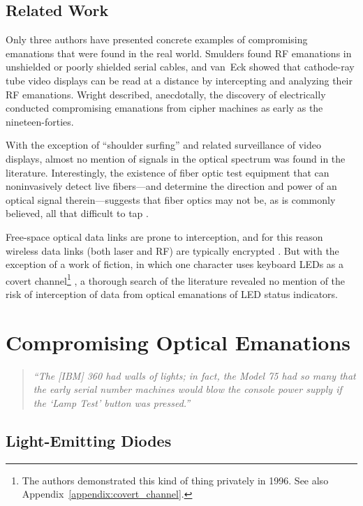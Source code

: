 \documentclass{acmtrans2e}
\begin{document}
\subsection{Related Work}

Only three authors have presented concrete examples of compromising 
emanations that were found in the real world.  Smulders \citeyear{smulders}
found RF emanations in
unshielded or poorly shielded serial cables, and van~Eck \citeyear{van_Eck}
showed that cathode-ray tube video displays can be read at a distance by 
intercepting and analyzing their RF emanations.  Wright \citeyear{wright}
described, anecdotally, the discovery of electrically conducted
compromising emanations from cipher machines as early as the nineteen-forties.

With the exception of ``shoulder surfing'' and related surveillance 
of video displays, almost no mention of signals in the optical spectrum 
was found in the literature.  Interestingly, the existence 
of fiber optic test equipment that can
noninvasively detect live fibers---and determine the direction and power
of an optical signal therein---suggests that fiber optics may not be, as
is commonly believed, all that difficult to tap \cite{exfo_data_sheet}.

Free-space optical data links are prone to interception, and 
for this reason wireless data links (both laser and RF) are typically 
encrypted \cite{lathrop}.  But with the exception of a work of fiction,
in which one
character uses keyboard LEDs as a covert channel\footnote{The authors
demonstrated this kind of thing privately in 1996.  See also
Appendix~\ref{appendix:covert_channel}.} \cite{cryptonomicon}, a thorough
search of the literature revealed no mention of the risk of interception
of data from optical emanations of LED status indicators.

\section{Compromising Optical Emanations}

\begin{quote}
\emph{``The [IBM] 360 had walls of lights; in fact, the Model 75 had so
many that the early serial number machines would blow the console power 
supply if the `Lamp Test' button was pressed.''} \cite{morris}
\end{quote}

\subsection{Light-Emitting Diodes}
\end{document}

